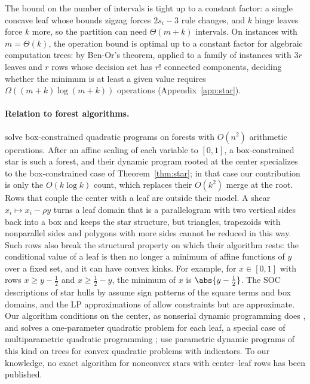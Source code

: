 The bound on the number of intervals is tight up to a constant factor: a
single concave leaf whose bounds zigzag forces $2s_i-3$ rule changes, and $k$
hinge leaves force $k$ more, so the partition can need $\Theta(m+k)$
intervals. On instances with $m=\Theta(k)$, the operation bound is optimal up
to a constant factor for algebraic computation trees: by Ben-Or's theorem,
applied to a family of instances with $3r$ leaves and $r$ rows whose decision
set has $r!$ connected components, deciding whether the minimum is at least a
given value requires $\Omega((m+k)\log(m+k))$ operations
(Appendix~\ref{app:star}).

\paragraph{Relation to forest algorithms.}
\citet{DelPiaKhajavirad2026} solve box-constrained quadratic programs on
forests with $O(n^2)$ arithmetic operations. After an affine scaling of each
variable to $[0,1]$, a box-constrained star is such a forest, and their
dynamic program rooted at the center specializes to the box-constrained case
of Theorem~\ref{thm:star}; in that case our contribution is only the
$O(k\log k)$ count, which replaces their $O(k^2)$ merge at the root. Rows
that couple the center with a leaf are outside their model. A shear
$x_i\mapsto x_i-\rho y$ turns a leaf domain that is a parallelogram with two
vertical sides back into a box and keeps the star structure, but triangles,
trapezoids with nonparallel sides and polygons with more sides cannot be
reduced in this way. Such rows also break the structural property on which
their algorithm rests: the conditional value of a leaf is then no longer a
minimum of affine functions of $y$ over a fixed set, and it can have convex
kinks. For example, for $x\in[0,1]$ with rows $x\ge y-\tfrac12$ and
$x\ge\tfrac12-y$, the minimum of $x$ is $\abs{y-\tfrac12}$. The SOC
descriptions of star hulls by \citet{DeyKhajavirad2025} assume sign patterns
of the square terms and box domains, and the LP approximations of
\citet{BienstockMunoz2018} allow constraints but are approximate. Our
algorithm conditions on the center, as nonserial dynamic programming does
\citep{BerteleBrioschi1972}, and solves a one-parameter quadratic problem for
each leaf, a special case of multiparametric quadratic programming
\citep{Bemporad2002}; \citet{BhathenaEtAl2025} use parametric dynamic
programs of this kind on trees for convex quadratic problems with
indicators. To our knowledge, no exact algorithm for nonconvex stars with
center--leaf rows has been published.


